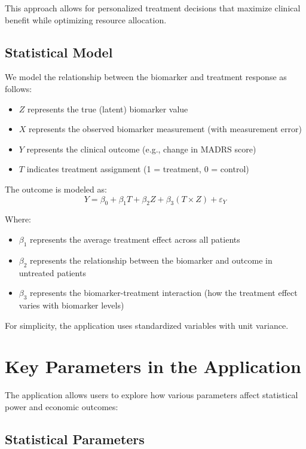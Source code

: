 \documentclass{article}
\begin{document}
This approach allows for personalized treatment decisions that maximize clinical benefit while optimizing resource allocation.

\subsection{Statistical Model}

We model the relationship between the biomarker and treatment response as follows:

\begin{itemize}
    \item $Z$ represents the true (latent) biomarker value
    \item $X$ represents the observed biomarker measurement (with measurement error)
    \item $Y$ represents the clinical outcome (e.g., change in MADRS score)
    \item $T$ indicates treatment assignment (1 = treatment, 0 = control)
\end{itemize}

The outcome is modeled as:
\begin{equation}
Y = \beta_0 + \beta_1 T + \beta_2 Z + \beta_3 (T \times Z) + \varepsilon_Y
\end{equation}

Where:
\begin{itemize}
    \item $\beta_1$ represents the average treatment effect across all patients
    \item $\beta_2$ represents the relationship between the biomarker and outcome in untreated patients
    \item $\beta_3$ represents the biomarker-treatment interaction (how the treatment effect varies with biomarker levels)
\end{itemize}

For simplicity, the application uses standardized variables with unit variance.

\section{Key Parameters in the Application}

The application allows users to explore how various parameters affect statistical power and economic outcomes:

\subsection{Statistical Parameters}
\end{document}
